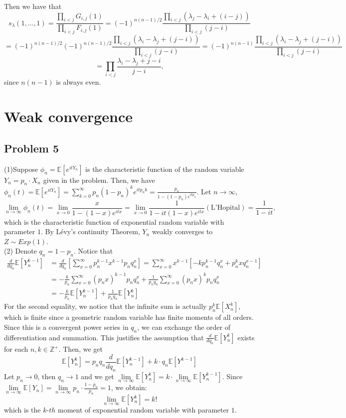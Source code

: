 \documentclass[12pt]{article}
\begin{document}
Then we have that
$$s_\lambda(1,\dots,1) = \frac{\prod_{i< j} G_{i, j}(1)}{\prod_{i< j} F_{i, j}(1)}
= (-1)^{n(n-1)/2} \frac{\prod_{i< j}  (\lambda_j - \lambda_i + (i - j))}{\prod _{i < j} ( j- i)}$$
$$= (-1)^{n(n-1)/2} (-1)^{n(n-1)/2} \frac{\prod_{i< j}  (\lambda_i - \lambda_j + (j -i))}{\prod _{i < j} (j- i)} = (-1)^{n(n-1)} \frac{\prod_{i< j}  (\lambda_i - \lambda_j + (j-i))}{\prod _{i < j } ( j- i)}$$
$$= \prod_{i< j}  \frac{\lambda_i - \lambda_j + j -i}{j-i},$$
since $n(n-1)$ is always even.



\section{Weak convergence}


	\subsection*{Problem 5}
	(1)Suppose $\phi_{n}=\mathbb{E}[e^{itY_{n}}]$ is the characteristic function of the random variable $Y_{n}=p_{n}\cdot X_{n}$ given in the problem. Then, we have $\phi_{n}(t)=\mathbb{E}[e^{itY_{n}}]=\sum\limits_{k=0}^{\infty}p_{n}(1-p_{n})^{k}e^{itp_{n}k}=\frac{p_{n}}{1-(1-p_{n})e^{itp_{n}}}$. Let $n\rightarrow\infty$, $$\lim\limits_{n\rightarrow\infty}\phi_{n}(t)=\lim\limits_{x\rightarrow 0}\frac{x}{1-(1-x)e^{itx}}=\lim\limits_{x\rightarrow 0}\frac{1}{1-it(1-x)e^{itx}}(\text{L'Hopital})=\frac{1}{1-it},$$
which is the characteristic function of exponential random variable with parameter $1$. By L\'{e}vy's continuity Theorem, $Y_{n}$ weakly converges to $Z\sim Exp(1)$.\\
(2) Denote $q_{n}=1-p_{n}$. Notice that 
\begin{align*}
\frac{d}{d q_{n}}\mathbb{E}[Y_{n}^{k-1}]&=\frac{d}{d q_{n}}[\sum_{x=0}^{\infty}p_{n}^{k-1}x^{k-1}p_{n}q_{n}^{x}]=	\sum_{x=0}^{\infty}x^{k-1}[-kp_{n}^{k-1}q_{n}^{x}+p_{n}^{k}x q_{n}^{x-1}]\\
&=-\frac{k}{p_{n}}\sum_{x=0}^{\infty}(p_{n}x)^{k-1}p_{n}q_{n}^{x}+\frac{1}{p_{n}q_{n}}\sum_{x=0}^{\infty}(p_{n}x)^{k}p_{n}q_{n}^{x}\\
&=-\frac{k}{p_{n}}\mathbb{E}[Y_{n}^{k-1}]+\frac{1}{p_{n}q_{n}}\mathbb{E}[Y_{n}^{k}]
\end{align*}
For the second equality, we notice that the infinite sum is actually $p_{n}^{k}\mathbb{E}[X_{n}^{k}]$, which is finite since a geometric random variable has finite moments of all orders. Since this is a convergent power series in $q_n$, we can exchange the order of differentiation and summation. This justifies the assumption that $\frac{d}{d q_{n}}\mathbb{E}[Y_{n}^{k}]$ exists for each $n,k\in \mathbb{Z}^{+}$. Then, we get $$\mathbb{E}[Y_{n}^{k}]=p_{n}q_{n}\frac{d}{d q_{n}}\mathbb{E}[Y_{n}^{k-1}]+k\cdot q_{n}\mathbb{E}[Y^{k-1}]$$
Let $p_{n}\rightarrow 0$, then $q_{n}\rightarrow 1$ and we get $\lim\limits_{n\rightarrow\infty}\mathbb{E}[Y_{n}^{k}]=k\cdot \lim\limits_{n\rightarrow\infty}\mathbb{E}[Y_{n}^{k-1}]$.
Since $\lim\limits_{n\rightarrow\infty}\mathbb{E}[Y_{n}]=\lim\limits_{n\rightarrow\infty}p_{n}\cdot\frac{1-p_{n}}{p_{n}}=1$, we obtain: $$\lim\limits_{n\rightarrow\infty}\mathbb{E}[Y_{n}^k]=k!$$
which is the $k$-$th$ moment of exponential random variable with parameter $1$.
\end{document}
